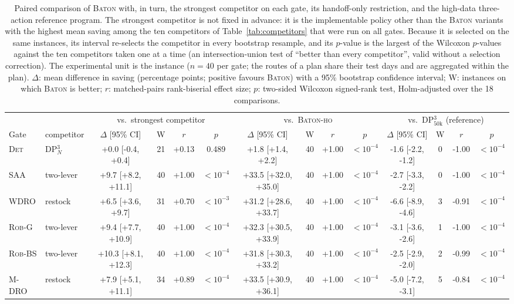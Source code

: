 \begin{table}[t]
\caption{Paired comparison of \textsc{Baton} with, in turn, the strongest
competitor on each gate, its handoff-only restriction, and the high-data
three-action reference program. The strongest competitor is not fixed in
advance: it is the implementable policy other than the \textsc{Baton}
variants with the highest mean saving among the ten competitors of
Table~\ref{tab:competitors} that were run on all gates. Because it is
selected on the same instances, its interval re-selects the competitor
in every bootstrap resample, and its $p$-value is the largest of the
Wilcoxon $p$-values against the ten competitors taken one at a time (an
intersection-union test of ``better than every competitor'', valid
without a selection correction). The experimental unit is the
instance ($n = 40$ per gate; the routes of a plan share their test days
and are aggregated within the plan). $\Delta$: mean difference in saving
(percentage points; positive favours \textsc{Baton}) with a 95\%
bootstrap confidence interval; W: instances on which \textsc{Baton} is
better; $r$: matched-pairs rank-biserial effect size; $p$: two-sided
Wilcoxon signed-rank test, Holm-adjusted over the 18 comparisons.}
\label{tab:stats}
\centering
\scriptsize
\setlength{\tabcolsep}{2.2pt}
\begin{adjustbox}{max width=\linewidth}
\begin{tabular}{l l cccc cccc cccc}
\toprule
& & \multicolumn{4}{c}{vs.\ strongest competitor}
& \multicolumn{4}{c}{vs.\ \textsc{Baton-ho}}
& \multicolumn{4}{c}{vs.\ DP$^3_{50\mathrm{k}}$ (reference)} \\
\cmidrule(lr){3-6}\cmidrule(lr){7-10}\cmidrule(lr){11-14}
Gate & competitor & $\Delta$ [95\% CI] & W & $r$ & $p$
& $\Delta$ [95\% CI] & W & $r$ & $p$ & $\Delta$ [95\% CI] & W & $r$ & $p$ \\
\midrule
\textsc{Det} & DP$^3_N$ & +0.0 [-0.4, +0.4] & 21 & +0.13 & 0.489 & +1.8 [+1.4, +2.2] & 40 & +1.00 & $<\!10^{-4}$ & -1.6 [-2.2, -1.2] & 0 & -1.00 & $<\!10^{-4}$ \\
\textsc{SAA} & two-lever & +9.7 [+8.2, +11.1] & 40 & +1.00 & $<\!10^{-4}$ & +33.5 [+32.0, +35.0] & 40 & +1.00 & $<\!10^{-4}$ & -2.7 [-3.3, -2.2] & 0 & -1.00 & $<\!10^{-4}$ \\
\textsc{WDRO} & restock & +6.5 [+3.6, +9.7] & 31 & +0.70 & $<\!10^{-3}$ & +31.2 [+28.6, +33.7] & 40 & +1.00 & $<\!10^{-4}$ & -6.6 [-8.9, -4.6] & 3 & -0.91 & $<\!10^{-4}$ \\
\textsc{Rob-G} & two-lever & +9.4 [+7.7, +10.9] & 40 & +1.00 & $<\!10^{-4}$ & +32.3 [+30.5, +33.9] & 40 & +1.00 & $<\!10^{-4}$ & -3.1 [-3.6, -2.6] & 1 & -1.00 & $<\!10^{-4}$ \\
\textsc{Rob-BS} & two-lever & +10.3 [+8.1, +12.3] & 40 & +1.00 & $<\!10^{-4}$ & +31.8 [+30.3, +33.2] & 40 & +1.00 & $<\!10^{-4}$ & -2.5 [-2.9, -2.0] & 2 & -0.99 & $<\!10^{-4}$ \\
\textsc{M-DRO} & restock & +7.9 [+5.1, +11.1] & 34 & +0.89 & $<\!10^{-4}$ & +33.5 [+30.9, +36.1] & 40 & +1.00 & $<\!10^{-4}$ & -5.0 [-7.2, -3.1] & 5 & -0.84 & $<\!10^{-4}$ \\
\bottomrule
\end{tabular}
\end{adjustbox}
\end{table}
